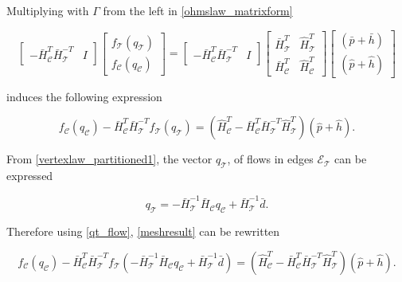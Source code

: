 Multiplying with $\Gamma$ from the left in \eqref{ohmslaw_matrixform} 

\begin{equation}
\label{ohmslaw_matrixform_B}
\begin{bmatrix} 
-\bar{H}^T_{\mathcal{C}}\bar{H}^{-T}_{\mathcal{T}} & I 
\end{bmatrix}
 \begin{bmatrix} 
 f_{\mathcal{T}}(q_\mathcal{T}) \\[3pt] 
 f_{\mathcal{C}}(q_\mathcal{C}) 
 \end{bmatrix}
 =
 \begin{bmatrix} 
-\bar{H}^T_{\mathcal{C}}\bar{H}^{-T}_{\mathcal{T}} & I 
\end{bmatrix}
  \begin{bmatrix}
   \bar{H}^T_{\mathcal{T}} & \hat{H}^T_{\mathcal{T}} \\[3pt]
   \bar{H}^T_{\mathcal{C}} & \hat{H}^T_{\mathcal{C}} 
   \end{bmatrix}
   \begin{bmatrix} 
 (\bar{p} + \bar{h}) \\[3pt]
 (\hat{p} + \hat{h}) 
 \end{bmatrix}
\end{equation}

induces the following expression

\begin{equation}
\label{meshresult}
f_{\mathcal{C}}(q_\mathcal{C}) -\bar{H}^T_{\mathcal{C}}\bar{H}^{-T}_{\mathcal{T}} f_{\mathcal{T}}(q_\mathcal{T}) = (\hat{H}^T_{\mathcal{C}} -\bar{H}^T_{\mathcal{C}}\bar{H}^{-T}_{\mathcal{T}}\hat{H}^T_{\mathcal{T}})(\hat{p} + \hat{h}).
\end{equation}

From \eqref{vertexlaw_partitioned1}, the vector $q_{\mathcal{T}}$, of flows in edges $\mathcal{E}_{\mathcal{T}}$ can be expressed

\begin{equation}
\label{qt_flow}
q_{\mathcal{T}} = -\bar{H}^{-1}_{\mathcal{T}} \bar{H}_{\mathcal{C}} q_\mathcal{C} + \bar{H}^{-1}_{\mathcal{T}} \bar{d}.
\end{equation}

Therefore using \eqref{qt_flow}, \eqref{meshresult} can be rewritten

\begin{equation}
\label{meshresult2}
f_{\mathcal{C}}(q_\mathcal{C}) -\bar{H}^T_{\mathcal{C}}\bar{H}^{-T}_{\mathcal{T}} f_{\mathcal{T}}(-\bar{H}^{-1}_{\mathcal{T}} \bar{H}_{\mathcal{C}} q_\mathcal{C} + \bar{H}^{-1}_{\mathcal{T}} \bar{d}) = (\hat{H}^T_{\mathcal{C}} -\bar{H}^T_{\mathcal{C}}\bar{H}^{-T}_{\mathcal{T}}\hat{H}^T_{\mathcal{T}})(\hat{p} + \hat{h}).
\end{equation} 

